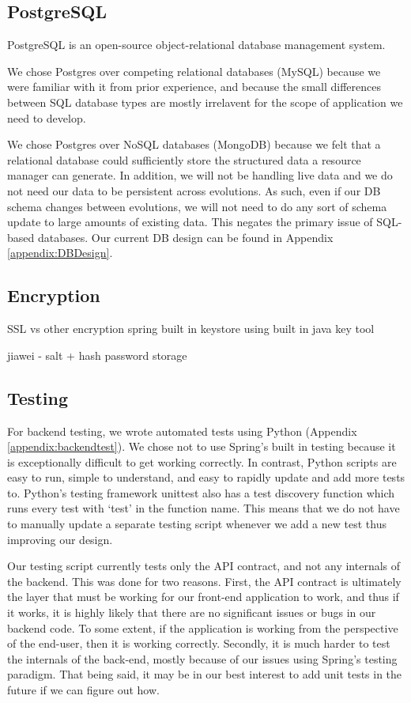 \documentclass[12pt]{article}
\begin{document}
\subsection{PostgreSQL}
PostgreSQL is an open-source object-relational database management system. 

We chose Postgres over competing relational databases (MySQL) because we were familiar with it from prior experience, and because the small differences between SQL database types are mostly irrelavent for the scope of application we need to develop. 

We chose Postgres over NoSQL databases (MongoDB) because we felt that a relational database could sufficiently store the structured data a resource manager can generate. In addition, we will not be handling live data and we do not need our data to be persistent across evolutions. As such, even if our DB schema changes between evolutions, we will not need to do any sort of schema update to large amounts of existing data. This negates the primary issue of SQL-based databases. Our current DB design can be found in Appendix \ref{appendix:DBDesign}.


\subsection{Encryption}
SSL vs other encryption
spring built in 
keystore using built in java key tool 

jiawei - salt + hash password storage

\subsection{Testing}
For backend testing, we wrote automated tests using Python (Appendix \ref{appendix:backendtest}). We chose not to use Spring's built in testing because it is exceptionally difficult to get working correctly. In contrast, Python scripts are easy to run, simple to understand, and easy to rapidly update and add more tests to. Python's testing framework unittest also has a test discovery function which runs every test with `test' in the function name. This means that we do not have to manually update a separate testing script whenever we add a new test thus improving our design.

Our testing script currently tests only the API contract, and not any internals of the backend. This was done for two reasons. First, the API contract is ultimately the layer that must be working for our front-end application to work, and thus if it works, it is highly likely that there are no significant issues or bugs in our backend code. To some extent, if the application is working from the perspective of the end-user, then it is working correctly. Secondly, it is much harder to test the internals of the back-end, mostly because of our issues using Spring's testing paradigm. That being said, it may be in our best interest to add unit tests in the future if we can figure out how. 
\end{document}
